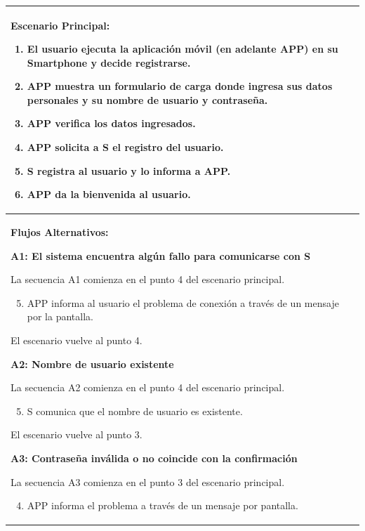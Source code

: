 \begin{longtable}{|l|p{5.5cm}|l|p{2cm}|l|p{1.9cm}|}
					\multicolumn{6}{|p{15cm}|}{ \textbf{Escenario Principal: }
							\begin{enumerate}
									\item El usuario ejecuta la aplicación móvil (en adelante APP) en su Smartphone y decide registrarse.
									\item APP muestra un formulario de carga donde ingresa sus datos personales y su nombre de usuario y contraseña.
									\item APP verifica los datos ingresados.
									\item APP solicita a S el registro del usuario.
									\item S registra al usuario y lo informa a APP.
									\item APP da la bienvenida al usuario.
							\end{enumerate}

					} \\ \hline

					\multicolumn{6}{|p{15cm}|}{ \textbf{Flujos Alternativos: }

					\textbf{A1: El sistema encuentra algún fallo para comunicarse con S}

					La secuencia A1 comienza en el punto 4 del escenario principal.
					\begin{enumerate}
							\setcounter{enumi}{4}
							\item APP informa al usuario el problema de conexión a través de un mensaje por la pantalla.
					\end{enumerate}

					El escenario vuelve al punto 4.

					\textbf{A2: Nombre de usuario existente}
					
					La secuencia A2 comienza en el punto 4 del escenario principal.
					\begin{enumerate}
							\setcounter{enumi}{4}
							\item S comunica que el nombre de usuario es existente.
					\end{enumerate}

					El escenario vuelve al punto 3.

					\textbf{A3: Contraseña inválida o no coincide con la confirmación}
					
					La secuencia A3 comienza en el punto 3 del escenario principal.
					\begin{enumerate}
							\setcounter{enumi}{3}
							\item APP informa el problema a través de un mensaje por pantalla.
					\end{enumerate}

}
\end{longtable}
